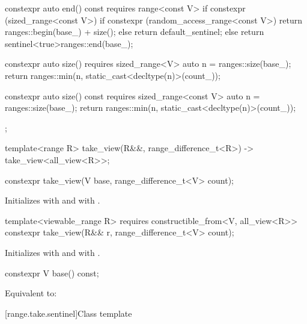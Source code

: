 \begin{codeblock}
{{    constexpr auto end() const requires range<const V> {
      if constexpr (sized_range<const V>) {
        if constexpr (random_access_range<const V>)
          return ranges::begin(base_) + size();
        else
          return default_sentinel;
      } else
        return sentinel<true>{ranges::end(base_)};
    }

    constexpr auto size() requires sized_range<V> {
      auto n = ranges::size(base_);
      return ranges::min(n, static_cast<decltype(n)>(count_));
    }

    constexpr auto size() const requires sized_range<const V> {
      auto n = ranges::size(base_);
      return ranges::min(n, static_cast<decltype(n)>(count_));
    }
  };

  template<range R>
    take_view(R&&, range_difference_t<R>)
      -> take_view<all_view<R>>;
}
\end{codeblock}

%
\begin{itemdecl}
constexpr take_view(V base, range_difference_t<V> count);
\end{itemdecl}

\begin{itemdescr}
\pnum
\effects
Initializes  with  and
 with .
\end{itemdescr}

%
\begin{itemdecl}
template<viewable_range R>
  requires constructible_from<V, all_view<R>>
constexpr take_view(R&& r, range_difference_t<V> count);
\end{itemdecl}

\begin{itemdescr}
\pnum
\effects
Initializes  with 
and  with .
\end{itemdescr}

%
\begin{itemdecl}
constexpr V base() const;
\end{itemdecl}

\begin{itemdescr}
\pnum
\effects
Equivalent to: 
\end{itemdescr}

[range.take.sentinel]{Class template }

